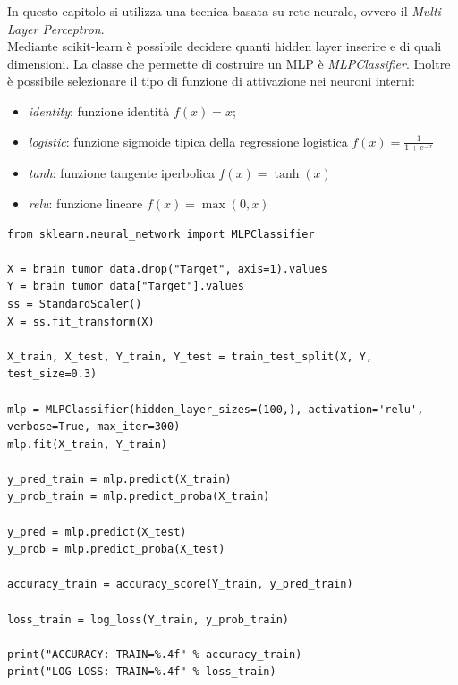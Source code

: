 In questo capitolo si utilizza una tecnica basata su rete neurale, ovvero il \textit{Multi-Layer Perceptron}.\\
Mediante scikit-learn è possibile decidere quanti hidden layer inserire e di quali dimensioni. La classe che permette di costruire un MLP è \textit{MLPClassifier}. Inoltre è possibile selezionare il tipo di funzione di attivazione nei neuroni interni:
\begin{itemize}
	\item \textit{identity}: funzione identità $f(x)=x$;
	\item \textit{logistic}: funzione sigmoide tipica della regressione logistica $f(x)=\frac{1}{1+e^{-x}}$
	\item \textit{tanh}: funzione tangente iperbolica $f(x)=\tanh(x)$
	\item \textit{relu}: funzione lineare $f(x)=\max(0,x)$
\end{itemize}
\begin{lstlisting}
from sklearn.neural_network import MLPClassifier

X = brain_tumor_data.drop("Target", axis=1).values
Y = brain_tumor_data["Target"].values
ss = StandardScaler()
X = ss.fit_transform(X)

X_train, X_test, Y_train, Y_test = train_test_split(X, Y, test_size=0.3)

mlp = MLPClassifier(hidden_layer_sizes=(100,), activation='relu', verbose=True, max_iter=300)
mlp.fit(X_train, Y_train)

y_pred_train = mlp.predict(X_train)
y_prob_train = mlp.predict_proba(X_train)

y_pred = mlp.predict(X_test)
y_prob = mlp.predict_proba(X_test)

accuracy_train = accuracy_score(Y_train, y_pred_train)

loss_train = log_loss(Y_train, y_prob_train)

print("ACCURACY: TRAIN=%.4f" % accuracy_train)
print("LOG LOSS: TRAIN=%.4f" % loss_train)
\end{lstlisting}


